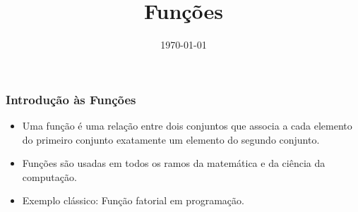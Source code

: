 \title{Funções}

\date{\today}
\frame{\titlepage}



\begin{frame}
  \frametitle{Introdução às Funções}
  \begin{itemize}
    \item Uma função é uma relação entre dois conjuntos que associa a cada elemento do primeiro conjunto exatamente um elemento do segundo conjunto.
    \item Funções são usadas em todos os ramos da matemática e da ciência da computação.
    \item Exemplo clássico: Função fatorial em programação.
  \end{itemize}
\end{frame}



